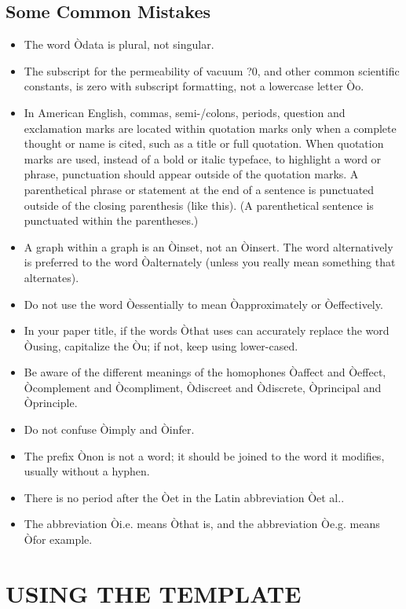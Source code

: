\documentclass[letterpaper, 10 pt, conference]{ieeeconf}  %
\begin{document}
	\subsection{Some Common Mistakes}
	\begin{itemize}
		
		
		\item The word Òdata is plural, not singular.
		\item The subscript for the permeability of vacuum ?0, and other common scientific constants, is zero with subscript formatting, not a lowercase letter Òo.
		\item In American English, commas, semi-/colons, periods, question and exclamation marks are located within quotation marks only when a complete thought or name is cited, such as a title or full quotation. When quotation marks are used, instead of a bold or italic typeface, to highlight a word or phrase, punctuation should appear outside of the quotation marks. A parenthetical phrase or statement at the end of a sentence is punctuated outside of the closing parenthesis (like this). (A parenthetical sentence is punctuated within the parentheses.)
		\item A graph within a graph is an Òinset, not an Òinsert. The word alternatively is preferred to the word Òalternately (unless you really mean something that alternates).
		\item Do not use the word Òessentially to mean Òapproximately or Òeffectively.
		\item In your paper title, if the words Òthat uses can accurately replace the word Òusing, capitalize the Òu; if not, keep using lower-cased.
		\item Be aware of the different meanings of the homophones Òaffect and Òeffect, Òcomplement and Òcompliment, Òdiscreet and Òdiscrete, Òprincipal and Òprinciple.
		\item Do not confuse Òimply and Òinfer.
		\item The prefix Ònon is not a word; it should be joined to the word it modifies, usually without a hyphen.
		\item There is no period after the Òet in the Latin abbreviation Òet al..
		\item The abbreviation Òi.e. means Òthat is, and the abbreviation Òe.g. means Òfor example.
		
	\end{itemize}
	
	
	\section{USING THE TEMPLATE}
	
\end{document}
